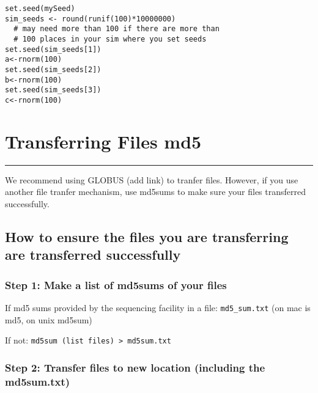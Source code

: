 \documentclass[
  letterpaper,
  DIV=11,
  numbers=noendperiod]{scrreprt}
\begin{document}
\begin{verbatim}
set.seed(mySeed)
sim_seeds <- round(runif(100)*10000000) 
  # may need more than 100 if there are more than 
  # 100 places in your sim where you set seeds
set.seed(sim_seeds[1])
a<-rnorm(100)
set.seed(sim_seeds[2])
b<-rnorm(100)
set.seed(sim_seeds[3])
c<-rnorm(100)
\end{verbatim}

\hypertarget{transferring-files-md5}{%
\chapter{Transferring Files md5}\label{transferring-files-md5}}

\begin{center}\rule{0.5\linewidth}{0.5pt}\end{center}

We recommend using GLOBUS (add link) to tranfer files. However, if you
use another file tranfer mechanism, use md5sums to make sure your files
transferred successfully.

\hypertarget{how-to-ensure-the-files-you-are-transferring-are-transferred-successfully}{%
\section*{\texorpdfstring{\textbf{How to ensure the files you are
transferring are transferred
successfully}}{How to ensure the files you are transferring are transferred successfully}}\label{how-to-ensure-the-files-you-are-transferring-are-transferred-successfully}}

\hypertarget{step-1-make-a-list-of-md5sums-of-your-files}{%
\subsection*{\texorpdfstring{\textbf{Step 1: Make a list of md5sums of
your
files}}{Step 1: Make a list of md5sums of your files}}\label{step-1-make-a-list-of-md5sums-of-your-files}}

If md5 sums provided by the sequencing facility in a file:
\texttt{md5\_sum.txt} (on mac is md5, on unix md5sum)

If not: \texttt{md5sum\ (list\ files)\ \textgreater{}\ md5sum.txt}

\hypertarget{step-2-transfer-files-to-new-location-including-the-md5sum.txt}{%
\subsection*{\texorpdfstring{\textbf{Step 2: Transfer files to new
location (including the
md5sum.txt)}}{Step 2: Transfer files to new location (including the md5sum.txt)}}\label{step-2-transfer-files-to-new-location-including-the-md5sum.txt}}
\end{document}
